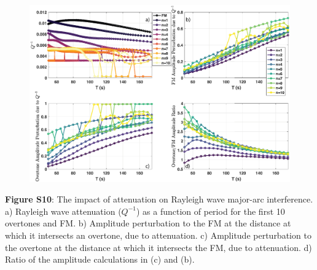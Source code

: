 \documentclass[extra,mreferee]{gji}
\begin{document}
\newpage
\begin{figure}
 \noindent\includegraphics[width=1\textwidth]{FigS10_VSver.eps}
\end{figure}
\textbf{Figure S10}: The impact of attenuation on Rayleigh wave major-arc interference. a) Rayleigh wave attenuation ($Q^{-1}$) as a function of period for the first 10 overtones and FM. b)  Amplitude perturbation to the FM at the distance at which it intersects an overtone, due to attenuation. c) Amplitude perturbation to the overtone at the distance at which it intersects the FM, due to attenuation. d) Ratio of the amplitude calculations in (c) and (b).








\newpage
\newpage
\end{document}
